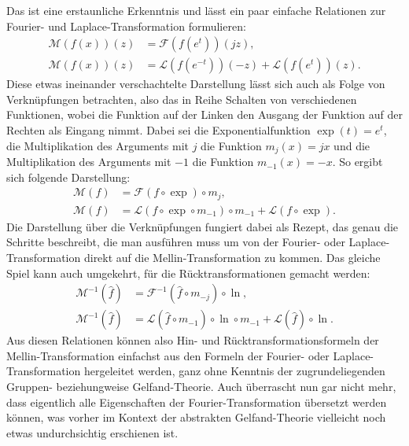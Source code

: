 Das ist eine erstaunliche Erkenntnis und lässt ein paar einfache 
Relationen zur Fourier- und Laplace-Transformation formulieren:
\begin{align*}
    \mathcal{M}\left(f(x)\right)(z) 
    &= \mathcal{F}\left(f (e^{t})\right)(jz), \\
    \mathcal{M}\left(f(x)\right)(z) 
    &= \mathcal{L}\left(f (e^{-t})\right)(-z) 
    + \mathcal{L}\left(f (e^{t})\right)(z) 
    .
\end{align*}
Diese etwas ineinander verschachtelte Darstellung lässt sich auch 
als Folge von Verknüpfungen betrachten, also das in Reihe Schalten 
von verschiedenen Funktionen, wobei die Funktion auf der Linken den 
Ausgang der Funktion auf der Rechten als Eingang nimmt.
Dabei sei die Exponentialfunktion $\exp(t) = e^t$, die Multiplikation 
des Arguments mit $j$ die Funktion $m_j(x) = jx$ und die 
Multiplikation des Arguments mit $-1$ die Funktion $m_{-1}(x) = -x$.
So ergibt sich folgende Darstellung:
\begin{align*}
    \mathcal{M}(f) 
    &= \mathcal{F}(f\circ\exp)\circ m_j, \\
    \mathcal{M}(f) 
    &= \mathcal{L}(f\circ\exp\circ m_{-1})\circ m_{-1}
    + \mathcal{L}(f\circ\exp)
    .
    \label{mellin:relationsgleichungen}
\end{align*}
Die Darstellung über die Verknüpfungen fungiert dabei als Rezept, 
das genau die Schritte beschreibt, die man ausführen muss um von der 
Fourier- oder Laplace-Transformation direkt auf die 
Mellin-Transformation zu kommen. 
Das gleiche Spiel kann auch umgekehrt, für die Rücktransformationen 
gemacht werden:
\begin{align*}
    \mathcal{M}^{-1}(\hat{f}) 
    &= \mathcal{F}^{-1}(\hat{f}\circ m_{-j})\circ\ln, \\
    \mathcal{M}^{-1}(\hat{f}) 
    &= \mathcal{L}(\hat{f}\circ m_{-1})\circ\ln\circ m_{-1}
    + \mathcal{L}(\hat{f})\circ\ln
    .
\end{align*}
Aus diesen Relationen können also Hin- und Rücktransformationsformeln 
der Mellin-Trans\-for\-ma\-tion einfachst aus den Formeln der 
Fourier- oder Laplace-Transformation hergeleitet werden, ganz ohne 
Kenntnis der zugrundeliegenden Gruppen- beziehungweise Gelfand-Theorie.
Auch überrascht nun gar nicht mehr, dass eigentlich alle Eigenschaften 
der Fourier-Transformation übersetzt werden können, was vorher im 
Kontext der abstrakten Gelfand-Theorie vielleicht noch etwas 
undurchsichtig erschienen ist.

